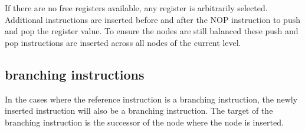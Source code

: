 If there are no free registers available, any register is arbitrarily selected. Additional instructions are inserted before and after the NOP instruction to push and pop the register value. To ensure the nodes are 
still balanced these push and pop instructions are inserted across all nodes of the current level. 

\subsection{branching instructions}
In the cases where the reference instruction is a branching instruction, the newly inserted instruction will also be a branching instruction. The target of the branching instruction is the successor of the node where 
the node is inserted. 


\begin{algorithm*}
  \SetAlgoLined
  \DontPrintSemicolon
  
  
\end{algorithm*}
